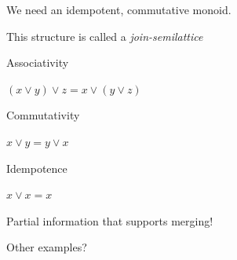 \documentclass[usenames,dvipsnames,svgnames,table,aspectratio=1610,mathserif]{beamer}
\newcommand{\nl}{\vspace{\baselineskip}}
\newcommand{\textslide}[1]{{
\begin{frame}
\begin{center}

#1

\end{center}
\end{frame}
}}
\begin{document}
\textslide{\Large{

We need an idempotent, commutative monoid.

This structure is called a {\it join-semilattice}

\nl

Associativity

$(x \vee y) \vee z = x \vee (y \vee z)$
\nl

Commutativity

$x \vee y = y \vee x$
\nl

Idempotence

$x \vee x = x$

}}


\textslide{
{\LARGE Partial information that supports merging!}
}



\textslide{\LARGE Other examples?}
\end{document}
